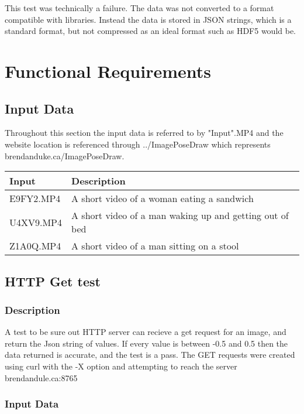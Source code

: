 \documentclass{scrreprt}
\begin{document}
This test was technically a failure. The data was not converted to a format
compatible with libraries. Instead the data is stored in JSON strings, which is
a standard format, but not compressed as an ideal format such as HDF5 would be.


\chapter{Functional Requirements}

\section{Input Data}

Throughout this section the input data is referred to by "Input".MP4 and the website location is referenced through ../ImagePoseDraw which represents brendanduke.ca/ImagePoseDraw.

\begin{table}[H]
        \centering
        \begin{tabular}{p{3cm}p{6cm}}
                \hline\hline
                Input & Description\\
                \hline\hline
                E9FY2.MP4  &  A short video of a woman eating a sandwich\\
                \hline
                U4XV9.MP4  &  A short video of a man waking up and getting out of bed\\
                \hline
                Z1A0Q.MP4 & A short video of a man sitting on a stool\\
                \hline
        \end{tabular}
\end{table}


\section{HTTP Get test}
\subsection{Description}

A test to be sure out HTTP server can recieve a get request for an image, and return the Json string of values. If every value is between -0.5 and 0.5 then the data returned is accurate, and the test is a pass. The GET requests were created using curl with the -X option and attempting to reach the server brendandule.ca:8765
\subsection{Input Data}
\end{document}
